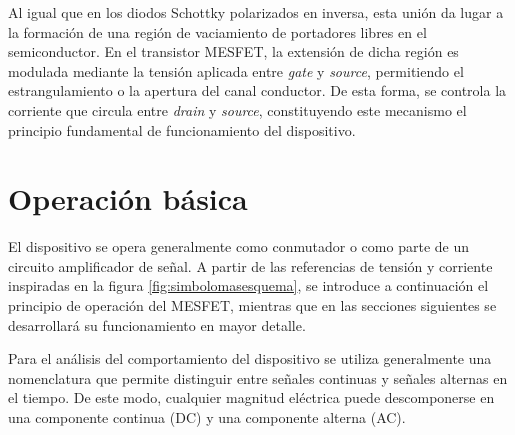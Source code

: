 \documentclass[a4paper]{article}
\begin{document}
Al igual que en los diodos Schottky polarizados en inversa, esta unión da lugar a la formación de una región de vaciamiento de portadores libres en el semiconductor. En el transistor MESFET, la extensión de dicha región es modulada mediante la tensión aplicada entre \textit{gate} y \textit{source}, permitiendo el estrangulamiento o la apertura del canal conductor. De esta forma, se controla la corriente que circula entre \textit{drain} y \textit{source}, constituyendo este mecanismo el principio fundamental de funcionamiento del dispositivo.


\section{Operación básica}
\label{sec:modelo_clasico}

El dispositivo se opera generalmente como conmutador o como parte de un circuito amplificador de señal. A partir de las referencias de tensión y corriente inspiradas en la figura \ref{fig:simbolomasesquema}, se introduce a continuación el principio de operación del MESFET, mientras que en las secciones siguientes se desarrollará su funcionamiento en mayor detalle.

Para el análisis del comportamiento del dispositivo se utiliza generalmente una nomenclatura que permite distinguir entre señales continuas y señales alternas en el tiempo. De este modo, cualquier magnitud eléctrica puede descomponerse en una componente continua (DC) y una componente alterna (AC). 

\end{document}
